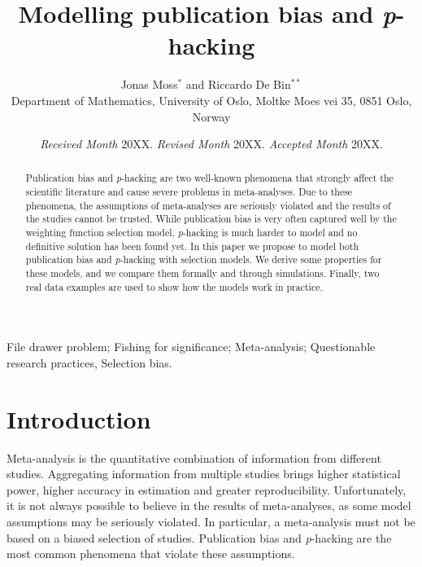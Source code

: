 \documentclass[useAMS,usenatbib,referee]{biom}
\author{Jonas Moss$^{*}$\email{jonasmgj@math.uio.no} and
Riccardo De Bin$^{**}$\email{debin@math.uio.no}\\
Department of Mathematics, University of Oslo, Moltke Moes vei 35, 0851 Oslo, Norway}
\title[Modelling publication bias and \textit{p}-hacking]{Modelling publication bias and \textit{p}-hacking}
\begin{document}
\date{{\it Received Month} 20XX. {\it Revised Month} 20XX.  {\it Accepted Month} 20XX.}

\pagerange{\pageref{firstpage}--\pageref{lastpage}} 


\label{firstpage}

\begin{abstract}
Publication bias and \textit{p}-hacking are two well-known phenomena that strongly affect the scientific literature and cause severe problems in meta-analyses. Due to these phenomena, the assumptions of meta-analyses are seriously violated and the results of the studies cannot be trusted. While publication bias is very often captured well by the weighting function selection model, \textit{p}-hacking is much harder to model and no definitive solution has been found yet. In this paper we propose to model both publication bias and \textit{p}-hacking with selection models. We derive some properties for these models, and we compare them formally and through simulations. Finally, two real data examples are used to show how the models work in practice.
\end{abstract}

\begin{keywords}
File drawer problem; Fishing for significance; Meta-analysis; Questionable research practices, Selection bias.
\end{keywords}

\maketitle

\section{Introduction}

Meta-analysis is the quantitative combination of information from different studies. Aggregating information from multiple studies brings higher statistical power, higher accuracy in estimation and greater reproducibility. Unfortunately, it is not always possible to believe in the results of meta-analyses, as some model assumptions may be seriously violated. In particular, a meta-analysis must not be based on a biased selection of studies. Publication bias \citep{sterling1959publication} and \textit{p}-hacking \citep{simmons2011false} are the most common phenomena that violate these assumptions. 
\end{document}
